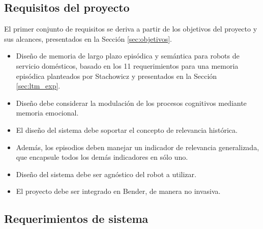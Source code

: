 \subsection{Requisitos del proyecto}

El primer conjunto de requisitos se deriva a partir de los objetivos del proyecto y sus alcances, presentados en la Sección \ref{sec:objetivos}.
\begin{itemize}
\item {} Diseño de memoria de largo plazo episódica y semántica para robots de servicio domésticos, basado en los 11 requerimientos para una memoria episódica planteados por Stachowicz \cite{Stachowicz2012} y presentados en la Sección \ref{sec:ltm_exp}.
\item {} Diseño debe considerar la modulación de los procesos cognitivos mediante memoria emocional.
\item {} El diseño del sistema debe soportar el concepto de relevancia histórica.
\item {} Además, los episodios deben manejar un indicador de relevancia generalizada, que encapsule todos los demás indicadores en sólo uno.
\item {} Diseño del sistema debe ser agnóstico del robot a utilizar.
\item {} El proyecto debe ser integrado en Bender, de manera no invasiva.
\end{itemize}


\subsection{Requerimientos de sistema}


